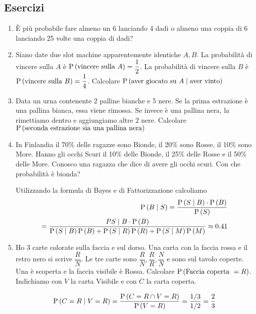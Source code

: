 \subsection{Esercizi}

\begin{enumerate}
	\item È più probabile fare almeno un 6 lanciando 4 dadi o almeno una coppia di 6 lanciando 25 volte una coppia di dadi?
	
	\item Siano date due slot machine apparentemente identiche $ A,B $. La probabilità di vincere sulla $ A $ è $ \text{P}\left(\text{vincere sulla }A\right) = \dfrac{1}{2}$. La probabilità di vincere sulla $ B $ è $ \text{P}\left(\text{vincere sulla }B\right) = \dfrac{1}{4}$. Calcolare $ \text{P}\left(\text{aver giocato su }A \mid \text{aver vinto}\right) $
	
	\item Data un urna contenente 2 palline bianche e 5 nere. Se la prima estrazione è una pallina bianca, essa viene rimossa. Se invece è una pallina nera, la rimettiamo dentro e aggiungiamo altre 2 nere. Calcolare $ \text{P}\left(\text{seconda estrazione sia una pallina nera}\right) $

	\item In Finlandia il 70\% delle ragazze sono Bionde, il 20\% sono Rosse, il 10\% sono More. Hanno gli occhi Scuri il 10\% delle Bionde, il 25\% delle Rosse e il 50\% delle More.
	Conosco una ragazza che dice di avere gli occhi scuri. Con che probabilità è bionda?
	
	Utilizzando la formula di Bayes e di Fattorizzazione calcoliamo
	\[ \begin{aligned}
	\text{P}\left(B \mid S\right) = \dfrac{\text{P}\left(S \mid B\right) \cdot \text{P}\left(B\right)}{\text{P}\left(S\right)} \\
	= \dfrac{P{S \mid B} \cdot \text{P}\left(B\right)}{\text{P}\left(S \mid B\right) \text{P}\left(B\right) + \text{P}\left(S \mid R\right) \text{P}\left(R\right) + \text{P}\left(S \mid M\right) \text{P}\left(M\right)} \approx 0.41
	\end{aligned} \]
	
	\item Ho 3 carte colorate sulla faccia e sul dorso. Una carta con la faccia rossa e il retro nero si scrive $ \dfrac{R}{N} $. Le tre carte sono $ \dfrac{R}{N}, \dfrac{R}{R}, \dfrac{N}{N} $ e sono sul tavolo coperte. Una è scoperta e la faccia visibile è Rossa. Calcolare $ \text{P}\left(\text{Faccia coperta } = R\right) $. Indichiamo con $ V $ la carta Visibile e con $ C $ la carta coperta.
	
	\[ \begin{aligned}
	\text{P}\left(C = R \mid V = R\right) = \dfrac{\text{P}\left(C = R \cap V = R\right)}{\text{P}\left(V = R\right)} = \dfrac{1/3}{1/2} = \dfrac{2}{3}
	\end{aligned} \]
	

\end{enumerate}
